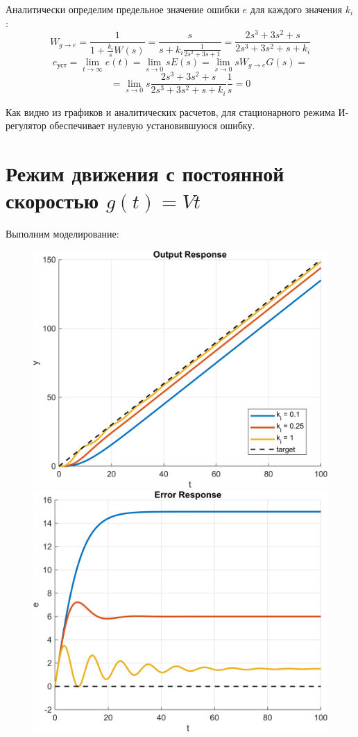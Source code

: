 Аналитически определим предельное значение ошибки $e$ для каждого значения $k_i$:
\[
W_{g\to e} = \frac{1}{1 + \frac{k_i}{s} W(s)}
= \frac{s}{s + k_i \frac{1}{2s^2 + 3s + 1}}
= \frac{2s^3 + 3s^2 + s}{2s^3 + 3s^2 + s + k_i}
\]
\[
e_{\text{уст}} = \lim_{t \to \infty} e(t)
= \lim_{s \to 0} s E(s)
= \lim_{s \to 0} s W_{g\to e} G(s) =
\]\[
= \lim_{s \to 0} s \frac{2s^3 + 3s^2 + s}{2s^3 + 3s^2 + s + k_i} \frac{1}{s}
= 0
\]

Как видно из графиков и аналитических расчетов, для стационарного режима
И-регулятор обеспечивает нулевую установившуюся ошибку.
\newpage
\section{Режим движения с постоянной скоростью $g(t) = Vt$}
Выполним моделирование:
\begin{figure}[H]
    \centering
    \begin{minipage}{0.45\textwidth}
        \centering
        \includegraphics[width=1\textwidth, trim={1cm 0cm 1cm 0cm}]{../images/4_3.png}
    \end{minipage}
    \hfill
    \begin{minipage}{0.45\textwidth}
        \centering
        \includegraphics[width=1\textwidth, trim={1cm 0cm 1cm 0cm}]{../images/4_4.png}

\end{minipage}
\end{figure}
